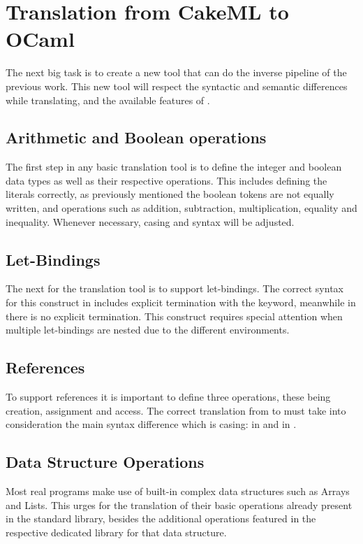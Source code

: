\section{Translation from CakeML to OCaml}

The next big task is to create a new tool that can do the inverse pipeline of the previous work. This new tool will respect
the syntactic and semantic differences while translating, and the available features of \cml.

\subsection{Arithmetic and Boolean operations}

The first step in any basic translation tool is to define the integer and boolean data types as well as their respective operations.
This includes defining the literals correctly, as previously mentioned the boolean tokens are not equally written, and operations
such as addition, subtraction, multiplication, equality and inequality. Whenever necessary, casing and syntax will be adjusted.

\subsection{Let-Bindings}

The next for the translation tool is to support let-bindings. The correct syntax for this construct in \cml includes explicit 
termination with the  keyword, meanwhile in \ocaml there is no explicit termination. This construct requires 
special attention when multiple let-bindings are nested due to the different environments.

\subsection{References}

To support references it is important to define three operations, these being creation, assignment and access. The correct translation
from \cml to \ocaml must take into consideration the main syntax difference which is casing:  in \ocaml
and  in \cml.

\subsection{Data Structure Operations}

Most real programs make use of built-in complex data structures such as Arrays and Lists. This urges for the translation of their 
basic operations already present in the standard library, besides the additional operations featured in the respective dedicated 
library for that data structure.

